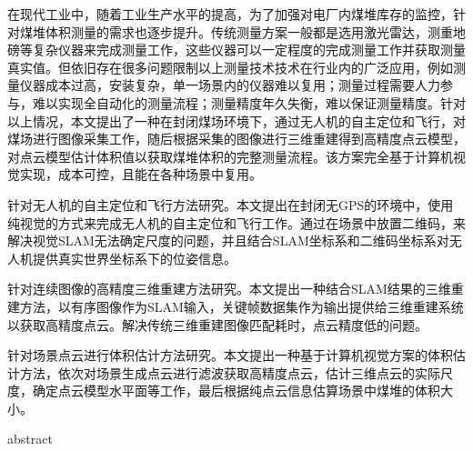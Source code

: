 
\begin{cabstract}  
  在现代工业中，随着工业生产水平的提高，为了加强对电厂内煤堆库存的监控，针对煤堆体积测量的需求也逐步提升。传统测量方案一般都是选用激光雷达，测重地磅等复杂仪器来完成测量工作，这些仪器可以一定程度的完成测量工作并获取测量真实值。但依旧存在很多问题限制以上测量技术技术在行业内的广泛应用，例如测量仪器成本过高，安装复杂，单一场景内的仪器难以复用；测量过程需要人力参与，难以实现全自动化的测量流程；测量精度年久失衡，难以保证测量精度。针对以上情况，本文提出了一种在封闭煤场环境下，通过无人机的自主定位和飞行，对煤场进行图像采集工作，随后根据采集的图像进行三维重建得到高精度点云模型，对点云模型估计体积值以获取煤堆体积的完整测量流程。该方案完全基于计算机视觉实现，成本可控，且能在各种场景中复用。
  
  针对无人机的自主定位和飞行方法研究。本文提出在封闭无GPS的环境中，使用纯视觉的方式来完成无人机的自主定位和飞行工作。通过在场景中放置二维码，来解决视觉SLAM无法确定尺度的问题，并且结合SLAM坐标系和二维码坐标系对无人机提供真实世界坐标系下的位姿信息。

  针对连续图像的高精度三维重建方法研究。本文提出一种结合SLAM结果的三维重建方法，以有序图像作为SLAM输入，关键帧数据集作为输出提供给三维重建系统以获取高精度点云。解决传统三维重建图像匹配耗时，点云精度低的问题。

  针对场景点云进行体积估计方法研究。本文提出一种基于计算机视觉方案的体积估计方法，依次对场景生成点云进行滤波获取高精度点云，估计三维点云的实际尺度，确定点云模型水平面等工作，最后根据纯点云信息估算场景中煤堆的体积大小。

\end{cabstract}


\begin{eabstract}
abstract
\end{eabstract}

